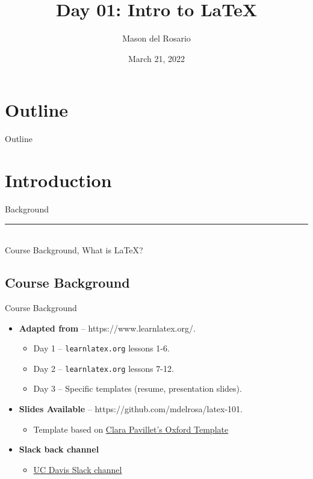 \documentclass{beamer}
\title{Day 01: Intro to \LaTeX }
\author{\small{Mason del Rosario}}
\institute{\LaTeX 101}
\date{March 21, 2022} %
\begin{document}
\footnotesize{
% 


{ 
\frame{\titlepage}}

\section*{Outline}\begin{frame}{Outline}\tableofcontents\end{frame}

\section{Introduction}

  \begin{frame}[plain]
    \vfill
    \centering
    \begin{beamercolorbox}[sep=8pt,center,shadow=true,rounded=true]{Background}
      \insertsectionhead\par%
      \color{davisblue}\noindent\rule{10cm}{1pt} \\
      \footnotesize{Course Background, What is \LaTeX?}
    \end{beamercolorbox}
    \vfill
  \end{frame}
  
\subsection{Course Background}

  \begin{frame}{Course Background}
    \begin{itemize} 
      \item \textbf{Adapted from} -- https://www.learnlatex.org/. 
        \begin{itemize}
          \item Day 1 -- \texttt{learnlatex.org} lessons 1-6.
          \item Day 2 -- \texttt{learnlatex.org} lessons 7-12.
          \item Day 3 -- Specific templates (resume, presentation slides).
        \end{itemize}
      \item \textbf{Slides Available} -- https://github.com/mdelrosa/latex-101.
      \begin{itemize}
        \item Template based on \href{https://www.overleaf.com/latex/templates/oxpav/xnjgrxthvjhg}{Clara Pavillet's Oxford Template}
      \end{itemize}
      \item \textbf{Slack back channel}
      \begin{itemize}
        \item \href{https://join.slack.com/share/zt-ul82okyc-SI2GftuwPx_lFyBXll9rjw}{UC Davis Slack channel}
      \end{itemize}
    \end{itemize}
  \end{frame}

}
\end{document}
